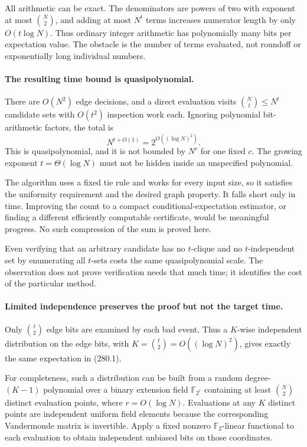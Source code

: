 \documentclass[11pt]{article}
\begin{document}
All arithmetic can be exact. The denominators are powers of two with exponent at most $\binom N2$, and adding at most $N^t$ terms increases numerator length by only $O(t\log N)$. Thus ordinary integer arithmetic has polynomially many bits per expectation value. The obstacle is the number of terms evaluated, not roundoff or exponentially long individual numbers.

\paragraph{The resulting time bound is quasipolynomial.}
There are $O(N^2)$ edge decisions, and a direct evaluation visits $\binom Nt\le N^t$ candidate sets with $O(t^2)$ inspection work each. Ignoring polynomial bit-arithmetic factors, the total is
\[
 N^{t+O(1)}=2^{O((\log N)^2)}.
 \tag{280.2}
\]
This is quasipolynomial, and it is not bounded by $N^c$ for one fixed $c$. The growing exponent $t=\Theta(\log N)$ must not be hidden inside an unspecified polynomial.

The algorithm uses a fixed tie rule and works for every input size, so it satisfies the uniformity requirement and the desired graph property. It falls short only in time. Improving the count to a compact conditional-expectation estimator, or finding a different efficiently computable certificate, would be meaningful progress. No such compression of the sum is proved here.

Even verifying that an arbitrary candidate has no $t$-clique and no $t$-independent set by enumerating all $t$-sets costs the same quasipolynomial scale. The observation does not prove verification needs that much time; it identifies the cost of the particular method.

\paragraph{Limited independence preserves the proof but not the target time.}
Only $\binom t2$ edge bits are examined by each bad event. Thus a $K$-wise independent distribution on the edge bits, with $K=\binom t2=O((\log N)^2)$, gives exactly the same expectation in (280.1).

For completeness, such a distribution can be built from a random degree-$(K-1)$ polynomial over a binary extension field $\mathbb F_{2^r}$ containing at least $\binom N2$ distinct evaluation points, where $r=O(\log N)$. Evaluations at any $K$ distinct points are independent uniform field elements because the corresponding Vandermonde matrix is invertible. Apply a fixed nonzero $\mathbb F_2$-linear functional to each evaluation to obtain independent unbiased bits on those coordinates.
\end{document}
